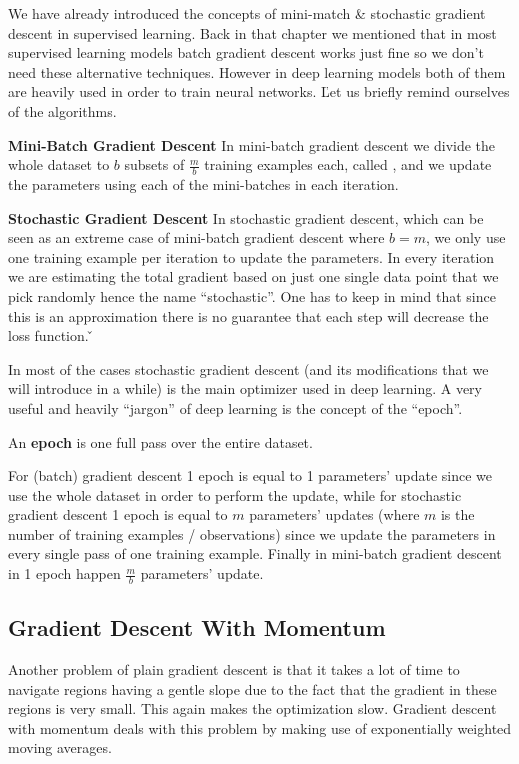 We have already introduced the concepts of mini-match \& stochastic gradient descent in supervised learning. Back in
that chapter we mentioned that in most supervised learning models batch gradient descent works just fine so we don't
need these alternative techniques. However in deep learning models both of them are heavily used in order to train
neural networks. \v

Let us briefly remind ourselves of the algorithms.
\bit
\item \textbf{Mini-Batch Gradient Descent} In mini-batch gradient descent we divide the whole dataset to $b$ subsets
of $\frac{m}{b}$ training examples each, called , and we update the parameters using each of the
mini-batches in each iteration.
\item \textbf{Stochastic Gradient Descent} In stochastic gradient descent, which can be seen as an extreme case of
mini-batch gradient descent where $b=m$, we only use one training example per iteration to update the parameters. In
every iteration we are estimating the total gradient based on just one single data point that we pick randomly hence
the name ``stochastic''. One has to keep in mind that since this is an approximation there is no guarantee that each
step will decrease the loss function. \v
\eit

In most of the cases stochastic gradient descent (and its modifications that we will introduce in a while) is the
main optimizer used in deep learning. A very useful and heavily ``jargon'' of deep learning is the concept of the
``epoch''.

\bd [Epoch]
An \textbf{epoch} is one full pass over the entire dataset.
\ed

For (batch) gradient descent 1 epoch is equal to 1 parameters' update since we use the whole dataset in order to
perform the update, while for stochastic gradient descent 1 epoch is equal to $m$ parameters' updates (where $m$ is
the number of training examples / observations) since we update the parameters in every single pass of one training
example. Finally in mini-batch gradient descent in 1 epoch happen $\frac{m}{b}$ parameters' update.

\subsection{Gradient Descent With Momentum}

Another problem of plain gradient descent is that it takes a lot of time to navigate regions having a gentle slope
due to the fact that the gradient in these regions is very small. This again makes the optimization slow. Gradient
descent with momentum deals with this problem by making use of exponentially weighted moving averages.

